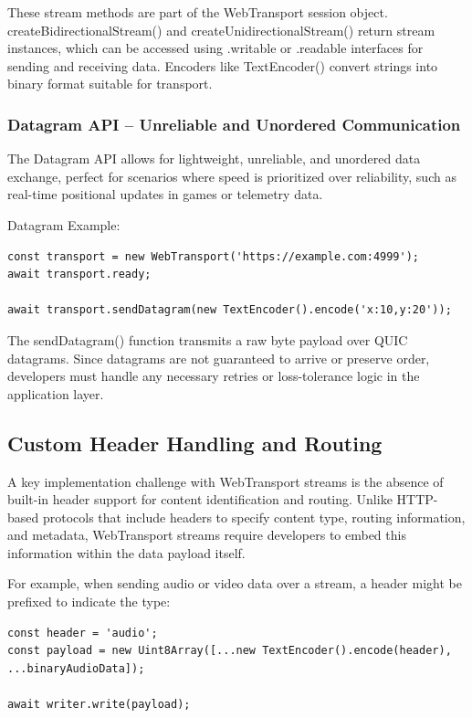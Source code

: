 These stream methods are part of the WebTransport session object. createBidirectionalStream() and createUnidirectionalStream() return stream instances, which can be accessed using .writable or .readable interfaces for sending and receiving data. Encoders like TextEncoder() convert strings into binary format suitable for transport.

\subsubsection{Datagram API – Unreliable and Unordered Communication}

The Datagram API allows for lightweight, unreliable, and unordered data exchange, perfect for scenarios where speed is prioritized over reliability, such as real-time positional updates in games or telemetry data.

Datagram Example:

\begin{lstlisting}[breaklines=true,basicstyle=\small\ttfamily,frame=single]
const transport = new WebTransport('https://example.com:4999');
await transport.ready;

await transport.sendDatagram(new TextEncoder().encode('x:10,y:20'));
\end{lstlisting}

The sendDatagram() function transmits a raw byte payload over QUIC datagrams. Since datagrams are not guaranteed to arrive or preserve order, developers must handle any necessary retries or loss-tolerance logic in the application layer.

\subsection{Custom Header Handling and Routing}

A key implementation challenge with WebTransport streams is the absence of built-in header support for content identification and routing. Unlike HTTP-based protocols that include headers to specify content type, routing information, and metadata, WebTransport streams require developers to embed this information within the data payload itself.

For example, when sending audio or video data over a stream, a header might be prefixed to indicate the type:

\begin{lstlisting}[breaklines=true,basicstyle=\small\ttfamily,frame=single]
const header = 'audio';
const payload = new Uint8Array([...new TextEncoder().encode(header), ...binaryAudioData]);

await writer.write(payload);
\end{lstlisting}

